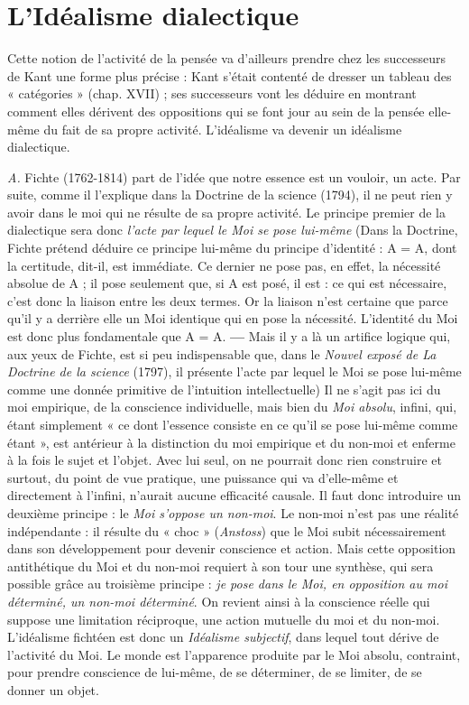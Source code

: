 \section{L'Idéalisme dialectique}%
Cette notion de l’activité
de la pensée va d’ailleurs prendre chez les successeurs de Kant une
forme plus précise : Kant s’était contenté de dresser un tableau des
« catégories » (chap. XVII) ; ses successeurs vont les déduire en montrant
comment elles dérivent des oppositions qui se font jour au sein de
la pensée elle-même du fait de sa propre activité. L’idéalisme va devenir
un idéalisme dialectique.

{\it A.} Fichte (1762-1814) part de l’idée que notre essence est un vouloir,
un acte. Par suite, comme il l'explique dans la Doctrine de la science (1794),
il ne peut rien y avoir dans le moi qui ne résulte de sa propre activité. Le
principe premier de la dialectique sera donc {\it l'acte par lequel le Moi se pose
lui-même}
%
{\scriptsize (Dans la Doctrine, Fichte prétend déduire ce principe lui-même du principe d'identité :
A = A, dont la certitude, dit-il, est immédiate. Ce dernier ne pose pas, en effet,
la nécessité absolue de A ; il pose seulement que, si A est posé, il est : ce qui est nécessaire,
c'est donc la liaison entre les deux termes. Or la liaison n’est certaine que parce qu'il y a
derrière elle un Moi identique qui en pose la nécessité. L'identité du Moi est donc plus
fondamentale que A = A. {\bf —} Mais il y a là un artifice logique qui, aux yeux de Fichte,
est si peu indispensable que, dans le {\it Nouvel exposé de La Doctrine de la science} (1797),
il présente l'acte par lequel le Moi se pose lui-même comme une donnée primitive de
l'intuition intellectuelle)}
%
Il ne s’agit pas ici du moi empirique, de la conscience individuelle,
mais bien du \textsf{\textit {Moi absolu}}, infini, qui, étant simplement « ce dont l'essence
consiste en ce qu'il se pose lui-même comme étant », est antérieur à la distinction
du moi empirique et du non-moi et enferme à la fois le sujet et l’objet.
Avec lui seul, on ne pourrait donc rien construire et surtout, du point de
vue pratique, une puissance qui va d'elle-même et directement à l'infini,
n'aurait aucune efficacité causale. Il faut donc introduire un deuxième
principe : le {\it Moi s'oppose un non-moi}. Le non-moi n’est pas une réalité indépendante :
il résulte du « choc » ({\it Anstoss}) que le Moi subit nécessairement
dans son développement pour devenir conscience et action. Mais cette
opposition antithétique du Moi et du non-moi requiert à son tour une
synthèse, qui sera possible grâce au troisième principe : {\it je pose dans le
Moi, en opposition au moi déterminé, un non-moi déterminé}. On revient ainsi
à la conscience réelle qui suppose une limitation réciproque, une action
mutuelle du moi et du non-moi. L’idéalisme fichtéen est donc un \textsf{\textit {Idéalisme
subjectif}}, dans lequel tout dérive de l’activité du Moi. Le monde est l’apparence
produite par le Moi absolu, contraint, pour prendre conscience de
lui-même, de se déterminer, de se limiter, de se donner un objet.

